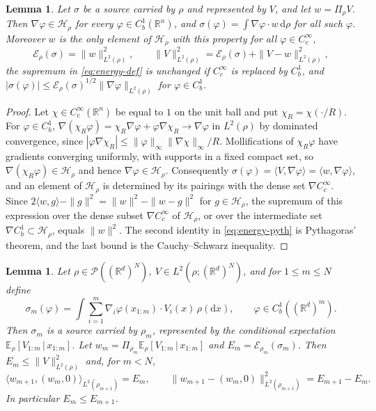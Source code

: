 \documentclass[11pt]{amsart}
\numberwithin{equation}{section}
\theoremstyle{plain}
\newtheorem{lemma}[theorem]{Lemma}
\theoremstyle{remark}
\newcommand{\R}{\mathbb{R}}
\newcommand{\E}{\mathbb{E}}
\newcommand{\cP}{\mathcal{P}}
\newcommand{\cE}{\mathcal{E}}
\newcommand{\cH}{\mathcal{H}}
\newcommand{\dd}{\mathrm{d}}
\newcommand{\la}{\langle}
\newcommand{\ra}{\rangle}
\begin{document}
\begin{lemma}\label{lem:energy}
Let $\sigma$ be a source carried by $\rho$ and represented by $V$, and let $w=\Pi_\rho V$. Then $\nabla\varphi\in\cH_\rho$ for every $\varphi\in C^1_b(\R^n)$, and $\sigma(\varphi)=\int\nabla\varphi\cdot w\,\dd\rho$ for all such $\varphi$. Moreover $w$ is the only element of $\cH_\rho$ with this property for all $\varphi\in C^\infty_c$,
\begin{equation}\label{eq:energy-pyth}
\cE_\rho(\sigma)=\|w\|^2_{L^2(\rho)},\qquad \|V\|^2_{L^2(\rho)}=\cE_\rho(\sigma)+\|V-w\|^2_{L^2(\rho)},
\end{equation}
the supremum in \eqref{eq:energy-def} is unchanged if $C^\infty_c$ is replaced by $C^1_b$, and $|\sigma(\varphi)|\le\cE_\rho(\sigma)^{1/2}\|\nabla\varphi\|_{L^2(\rho)}$ for $\varphi\in C^1_b$.
\end{lemma}

\begin{proof}
Let $\chi\in C^\infty_c(\R^n)$ be equal to $1$ on the unit ball and put $\chi_R=\chi(\cdot/R)$. For $\varphi\in C^1_b$, $\nabla(\chi_R\varphi)=\chi_R\nabla\varphi+\varphi\nabla\chi_R\to\nabla\varphi$ in $L^2(\rho)$ by dominated convergence, since $|\varphi\nabla\chi_R|\le\|\varphi\|_\infty\|\nabla\chi\|_\infty/R$. Mollifications of $\chi_R\varphi$ have gradients converging uniformly, with supports in a fixed compact set, so $\nabla(\chi_R\varphi)\in\cH_\rho$ and hence $\nabla\varphi\in\cH_\rho$. Consequently $\sigma(\varphi)=\la V,\nabla\varphi\ra=\la w,\nabla\varphi\ra$, and an element of $\cH_\rho$ is determined by its pairings with the dense set $\nabla C^\infty_c$. Since $2\la w,g\ra-\|g\|^2=\|w\|^2-\|w-g\|^2$ for $g\in\cH_\rho$, the supremum of this expression over the dense subset $\nabla C^\infty_c$ of $\cH_\rho$, or over the intermediate set $\nabla C^1_b\subset\cH_\rho$, equals $\|w\|^2$. The second identity in \eqref{eq:energy-pyth} is Pythagoras' theorem, and the last bound is the Cauchy--Schwarz inequality.
\end{proof}

\begin{lemma}\label{lem:marginal-energy}
Let $\rho\in\cP((\R^d)^N)$, $V\in L^2(\rho;(\R^d)^N)$, and for $1\le m\le N$ define
\begin{equation}\label{eq:marginal-source}
\sigma_m(\varphi)=\int\sum_{i=1}^m\nabla_i\varphi(x_{1:m})\cdot V_i(x)\,\rho(\dd x),\qquad \varphi\in C^1_b((\R^d)^m).
\end{equation}
Then $\sigma_m$ is a source carried by $\rho_m$, represented by the conditional expectation $\E_\rho[V_{1:m}\,|\,x_{1:m}]$. Let $w_m=\Pi_{\rho_m}\E_\rho[V_{1:m}\,|\,x_{1:m}]$ and $E_m=\cE_{\rho_m}(\sigma_m)$. Then $E_m\le\|V\|^2_{L^2(\rho)}$ and, for $m<N$,
\begin{equation}\label{eq:increment}
\la w_{m+1},(w_m,0)\ra_{L^2(\rho_{m+1})}=E_m,\qquad \|w_{m+1}-(w_m,0)\|^2_{L^2(\rho_{m+1})}=E_{m+1}-E_m.
\end{equation}
In particular $E_m\le E_{m+1}$.
\end{lemma}
\end{document}
